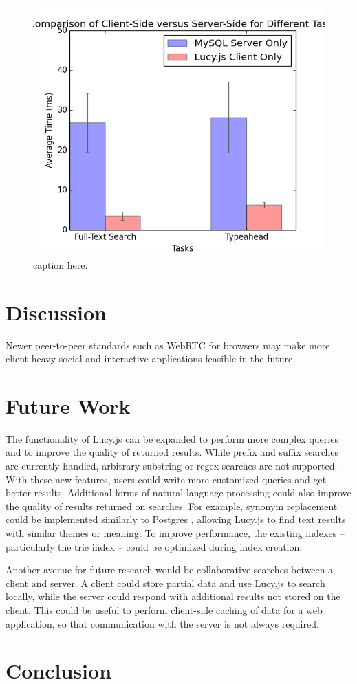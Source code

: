 \documentclass{vldb}
\begin{document}
\begin{figure}[h!]
   \includegraphics[scale=.53]{demo_results}
  \caption{caption here.}
\end{figure}



\section{Discussion}


Newer peer-to-peer standards such as WebRTC for browsers may make more client-heavy social and interactive applications feasible in the future.

\section{Future Work}
The functionality of Lucy.js can be expanded to perform more complex queries and to improve the quality of returned results. While prefix and suffix searches are currently handled, arbitrary substring or regex searches are not supported. With these new features, users could write more customized queries and get better results. Additional forms of natural language processing could also improve the quality of results returned on searches. For example, synonym replacement could be implemented similarly to Postgres , allowing Lucy.js to find text results with similar themes or meaning. To improve performance, the existing indexes -- particularly the trie index -- could be optimized during index creation.

Another avenue for future research would be collaborative searches between a client and server. A client could store partial data and use Lucy.js to search locally, while the server could respond with additional results not stored on the client. This could be useful to perform client-side caching of data for a web application, so that communication with the server is not always required.

\section{Conclusion}



\end{document}
